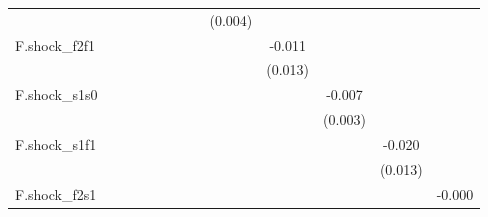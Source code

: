 {\begin{tabular}{l*{12}{c}}
            &                     &                     &                     &                     &                     &                     &                     &     (0.004)         &                     &                     &                     &                     \\
\addlinespace
F.shock\_f2f1&                     &                     &                     &                     &                     &                     &                     &                     &      -0.011         &                     &                     &                     \\
            &                     &                     &                     &                     &                     &                     &                     &                     &     (0.013)         &                     &                     &                     \\
\addlinespace
F.shock\_s1s0&                     &                     &                     &                     &                     &                     &                     &                     &                     &      -0.007\sym{**} &                     &                     \\
            &                     &                     &                     &                     &                     &                     &                     &                     &                     &     (0.003)         &                     &                     \\
\addlinespace
F.shock\_s1f1&                     &                     &                     &                     &                     &                     &                     &                     &                     &                     &      -0.020         &                     \\
            &                     &                     &                     &                     &                     &                     &                     &                     &                     &                     &     (0.013)         &                     \\
\addlinespace
F.shock\_f2s1&                     &                     &                     &                     &                     &                     &                     &                     &                     &                     &                     &      -0.000         \\

\end{tabular}}
